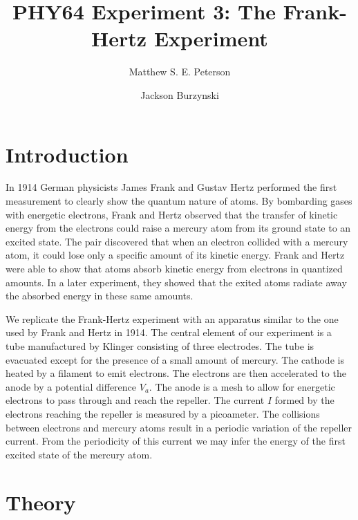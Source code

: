 \documentclass[aps, reprint,amsmath,amssymb]{revtex4-1} %
\begin{document}
\title{PHY64 Experiment 3: The Frank-Hertz Experiment}
\author{Matthew S. E. Peterson}
\author{Jackson Burzynski}
\maketitle

\section{Introduction}
In 1914 German physicists James Frank and Gustav Hertz performed the first measurement to clearly show the quantum nature of atoms. By bombarding gases with energetic electrons, Frank and Hertz observed that the transfer of kinetic energy from the electrons could raise a mercury atom from its ground state to an excited state. The pair discovered that when an electron collided with a mercury atom, it could lose only a specific amount of its kinetic energy. Frank and Hertz were able to show that atoms absorb kinetic energy from electrons in quantized amounts. In a later experiment, they showed that the exited atoms radiate away the absorbed energy in these same amounts.

We replicate the Frank-Hertz experiment with an apparatus similar to the one used by Frank and Hertz in 1914. The central element of our experiment is a tube manufactured by Klinger consisting of three electrodes. The tube is evacuated except for the presence of a small amount of mercury. The cathode is heated by a filament to emit electrons. The electrons are then accelerated to the anode by a potential difference $V_a$. The anode is a mesh to allow for energetic electrons to pass through and reach the repeller. The current $I$ formed by the electrons reaching the repeller is measured by a picoameter. The collisions between electrons and mercury atoms result in a periodic variation of the repeller current. From the periodicity of this current we may infer the energy of the first excited state of the mercury atom.

\section{Theory}
\end{document}
